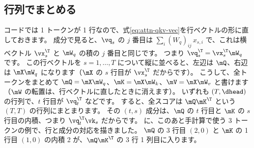 \subsection*{行列でまとめる}

コードでは 1 トークンが 1 行なので、式\eqref{eq:attn-qkv-vec}を行ベクトルの形に直しておきます。
成分で見ると、$\vq_s$ の $j$ 番目は $\sum_i (W_q)_{ij}\,x_{s,i}$ で、これは横ベクトル $\vx_s^\T$ と $\mW_q$ の積の $j$ 番目と同じです。
つまり $\vq_s^\T = \vx_s^\T\mW_q$ です。
この行ベクトルを $s=1,\dots,T$ について縦に並べると、左辺は $\mQ$、右辺は $\mX\mW_q$ になります（$\mX$ の $s$ 行目が $\vx_s^\T$ だからです）。
こうして、全トークンをまとめて $\mQ = \mX\mW_q$、$\mK = \mX\mW_k$、$\mV = \mX\mW_v$ と書けます（$\mW$ の転置は、行ベクトルに直したときに消えます）。
いずれも $(T, \dhead)$ の行列で、$t$ 行目が $\vq_t^\T$ などです。
すると、全スコアは $\mQ\mK^\T$ という $(T,T)$ の行列にまとまります。
その $(t,s)$ 成分は、$\mQ$ の $t$ 行目と $\mK$ の $s$ 行目の内積、つまり $\vq_t^\T\vk_s$ だからです。
に、このあと手計算で使う 3 トークンの例で、行と成分の対応を描きました。
$\mQ$ の 3 行目 $(2,0)$ と $\mK$ の 1 行目 $(1,0)$ の内積 2 が、$\mQ\mK^\T$ の 3 行 1 列目に入ります。

